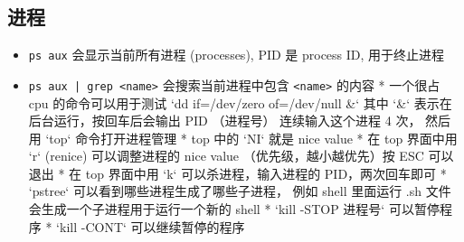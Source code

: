 \subsection{进程}
\begin{itemize}
\item \verb`ps aux` 会显示当前所有进程 (processes), PID 是 process ID, 用于终止进程
\item \verb`ps aux | grep <name>` 会搜索当前进程中包含 \verb`<name>` 的内容
* 一个很占 cpu 的命令可以用于测试
`dd if=/dev/zero of=/dev/null &`
其中 `&` 表示在后台运行，按回车后会输出 PID （进程号）
连续输入这个进程 4 次， 然后用 `top` 命令打开进程管理
* top 中的 `NI` 就是 nice value
* 在 top 界面中用 `r` (renice) 可以调整进程的 nice value （优先级，越小越优先）按 ESC 可以退出
* 在 top 界面中用 `k` 可以杀进程，输入进程的 PID，两次回车即可
* `pstree` 可以看到哪些进程生成了哪些子进程， 例如 shell 里面运行 .sh 文件会生成一个子进程用于运行一个新的 shell
* `kill -STOP 进程号` 可以暂停程序
* `kill -CONT` 可以继续暂停的程序
\end{itemize}
